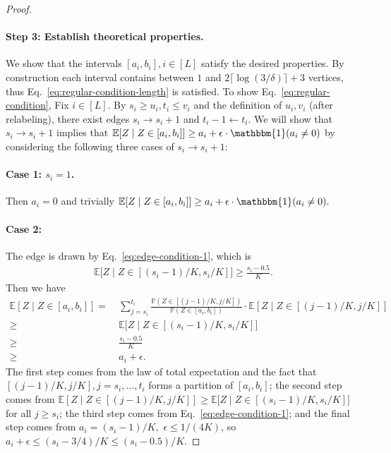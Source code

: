 \documentclass[11pt]{article}
\theoremstyle{statplain}
\theoremstyle{statdefinition}
\newcommand{\ra}{\rightarrow}
\newcommand{\la}{\leftarrow}
\newcommand{\E}{\mathbb{E}}
\newcommand{\PP}{\mathbb{P}}
\newcommand{\0}{\mathbf{0}}
\newcommand{\discreteNum}{K} %
\begin{document}
\begin{proof}
\paragraph{Step 3: Establish theoretical properties.}


We show that the intervals $[a_i,b_i], i\in[L]$ satisfy the desired properties. 
By construction each interval contains between $1$ and $2\lceil \log(3/\delta)\rceil+3$ vertices, thus Eq.~\eqref{eq:regular-condition-length} is satisfied.
To show Eq.~\eqref{eq:regular-condition}, Fix $i \in [L]$. 
By $s_i \geq u_i, t_i \leq v_i$ and the definition of $u_i,v_i$ (after relabeling), there exist edges $s_i \ra s_i + 1$ and $t_i - 1 \la t_i$. We will show that $s_i \ra s_i + 1$ implies that $\E[Z\mid Z \in [a_i,b_i]] \geq a_i + \epsilon \cdot \mathbbm{1}(a_i \neq 0)$ by considering the following three cases of $s_i \ra s_i + 1$:

\paragraph{Case 1: $s_i = 1$. } Then $a_i=0$ and 
trivially
$
    \E[Z\mid Z \in [a_i,b_i]] \geq a_i + \epsilon \cdot \mathbbm{1}(a_i \neq 0).
$



\paragraph{Case 2:  }
The edge is drawn by Eq.~\eqref{eq:edge-condition-1}, which is
\begin{align*}
    \E\Big[Z\mid Z \in [(s_i-1)/\discreteNum, s_i/\discreteNum]\Big] \geq  \frac{s_i-0.5}{\discreteNum} .
\end{align*}
Then we have
\begin{align*}
    \E[Z\mid Z \in [a_i,b_i]] = &~ \sum_{j=s_i}^{t_i} \frac{\PP(Z \in [(j-1)/\discreteNum, j/\discreteNum])}{\PP(Z \in [a_i,b_i])} \cdot \E[Z\mid Z \in [(j-1)/\discreteNum, j/\discreteNum]]\\
    \geq &~ \E\Big[Z\mid Z \in [(s_i-1)/\discreteNum, s_i/\discreteNum]\Big] \\
    \geq &~ \frac{s_i-0.5}{\discreteNum} \\
    \geq &~ a_i + \epsilon.
\end{align*}
The first step comes from the law of total expectation and the fact that $[(j-1)/\discreteNum, j/\discreteNum], j=s_i,\dots, t_i$ forms a partition of $[a_i,b_i]$; the second step comes from $\E[Z\mid Z \in [(j-1)/\discreteNum, j/\discreteNum]] \geq \E\Big[Z\mid Z \in [(s_i-1)/\discreteNum, s_i/\discreteNum]\Big]$ for all $j \geq s_i$; the third step comes from Eq.~\eqref{eq:edge-condition-1}; and the final step comes from
$a_i = (s_i-1)/\discreteNum,$ $ \epsilon \le 1/(4\discreteNum)$, so $ a_i + \epsilon \le (s_i-3/4)/\discreteNum \le (s_i - 0.5)/\discreteNum$.




\end{proof}
\end{document}
